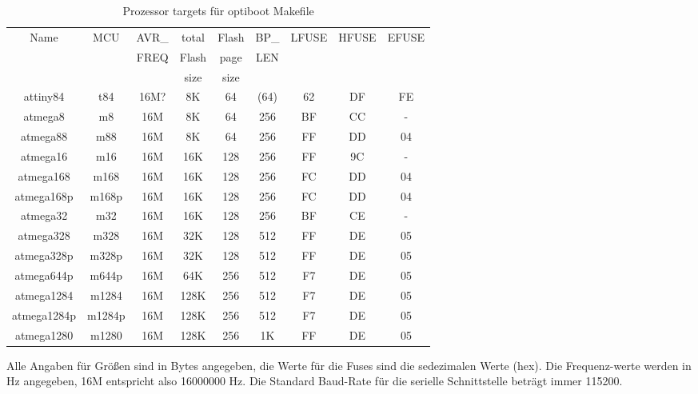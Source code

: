 \begin{table}[H]
  \begin{center}
    \begin{tabular}{| c | c | c | c | c | c | c | c | c |}
    \hline
             Name  & MCU & AVR\_ & total & Flash & BP\_ & LFUSE & HFUSE & EFUSE  \\
                   &     & FREQ  & Flash & page  & LEN  &       &       &        \\
                   &     &       &  size & size  &      &       &       &        \\
    \hline
    \hline
         attiny84 & t84   & 16M? &  8K   &  64   & (64) &  62   &  DF   & FE \\
    \hline
         atmega8  & m8    & 16M  &  8K   &  64   & 256  &  BF   &  CC   &  - \\
    \hline
         atmega88 & m88   & 16M  &  8K   &  64   & 256  &  FF   &  DD   &  04 \\
    \hline
       atmega16   & m16   & 16M  &  16K  & 128   & 256  &  FF   &  9C   &  - \\
    \hline
       atmega168  &  m168  & 16M  &  16K & 128   & 256  &  FC   &  DD   &  04 \\
       atmega168p &  m168p & 16M  &  16K & 128   & 256  &  FC   &  DD   &  04 \\
    \hline
       atmega32   &  m32   & 16M  &  16K & 128   & 256  &  BF   &  CE   &  - \\
    \hline
       atmega328  &  m328  & 16M  &  32K & 128   & 512  &  FF   &  DE   &  05 \\
       atmega328p & m328p & 16M  &  32K  & 128   & 512  &  FF   &  DE   &  05 \\
    \hline
       atmega644p & m644p & 16M  &  64K  & 256   & 512  &  F7   &  DE   &  05 \\
    \hline
     atmega1284  & m1284  & 16M  & 128K  & 256   & 512  &  F7   &  DE   &  05 \\
     atmega1284p & m1284p & 16M  & 128K  & 256   & 512  &  F7   &  DE   &  05 \\
    \hline
     atmega1280  & m1280  & 16M  &  128K & 256   & 1K   &  FF   &  DE   &  05 \\
    \hline
    \end{tabular}
  \end{center}
  \caption{Prozessor targets für optiboot Makefile}
  \label{tab:processors}
\end{table}

Alle Angaben für Größen sind in Bytes angegeben, die Werte für die Fuses sind die sedezimalen
Werte (hex). Die Frequenz-werte werden in Hz angegeben, 16M entspricht also 16000000 Hz.
Die Standard Baud-Rate für die serielle Schnittstelle beträgt immer 115200.

